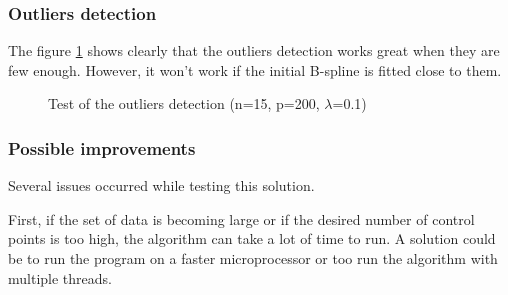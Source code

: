 \documentclass{article}
\newcommand{\vsp}{\vspace{\baselineskip}}
\begin{document}
\subsubsection{Outliers detection} \label{sec:outlier_res}

The figure \ref{fig:bsp_res_outlier} shows clearly that the outliers detection works great when they are few enough. However, it won't work if the initial B-spline is fitted close to them.

\begin{figure}[H]
    \centering
    \caption[Test of the outlier detection]{Test of the outliers detection (n=15, p=200, $\lambda$=0.1)}
    \label{fig:bsp_res_outlier}
\end{figure}

\subsubsection{Possible improvements}

Several issues occurred while testing this solution. 

\vsp

First, if the set of data is becoming large or if the desired number of control points is too high, the algorithm can take a lot of time to run. A solution could be to run the program on a faster microprocessor or too run the algorithm with multiple threads. 
\end{document}
